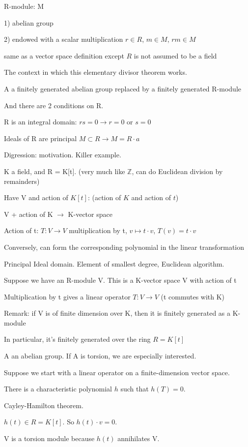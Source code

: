 \documentclass[12pt]{article}
\begin{document}
R-module: M

1) abelian group

2) endowed with a scalar multiplication $r \in R$, $m \in M$, $rm \in M$

same as a vector space definition except $R$ is not assumed to be a field

\noindent
The context in which this elementary divisor theorem works.

A a finitely generated abelian group replaced by a finitely generated R-module

And there are 2 conditions on R.

R is an integral domain: $rs = 0 \to r = 0$ or $s = 0$

Ideals of R are principal $M \subset R \to M = R\cdot a$

\noindent
Digression: motivation.  Killer example.

K a field, and R = K[t]. (very much like $\mathds{Z}$, can do Euclidean division by remainders)

Have V and action of $K[t]$: (action of $K$ and action of $t$)

V + action of K $\to$ K-vector space

Action of t: $T: V \to V$ multiplication by t, $v \mapsto t \cdot v$, $T(v) = t \cdot v$

Conversely, can form the corresponding polynomial in the linear transformation

Principal Ideal domain.  Element of smallest degree, Euclidean algorithm.

Suppose we have an R-module V.  This is a K-vector space V with action of t

Multiplication by t gives a linear operator $T: V \to V$ (t commutes with K)

\noindent
Remark: if V is of finite dimension over K, then it is finitely generated as a K-module

In particular, it's finitely generated over the ring $R = K[t]$

\noindent
A an abelian group.  If A is torsion, we are especially interested.

\noindent
Suppose we start with a linear operator on a finite-dimension vector space.

There is a characteristic polynomial $h$ such that $h(T) = 0$.

Cayley-Hamilton theorem.

$h(t) \in R = K[t]$.  So $h(t) \cdot v = 0$.

V is a torsion module because $h(t)$ annihilates V.
\end{document}
